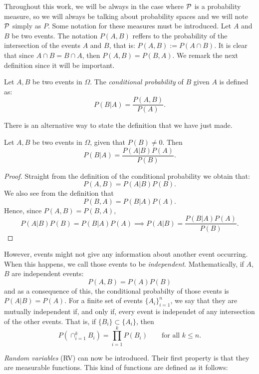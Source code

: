 Throughout this work, we will be always in the case where $\mathcal{P}$ is a probability measure, so we will always be talking about probability spaces and we will note $\mathcal{P}$ simply as $P$. Some notation for these measures must be introduced. Let $A$ and $B$ be two events.
The notation $P(A,B)$ reffers to the probability of the intersection of the events $A$ and $B$, that is: $P(A,B) := P(A\cap B)$.
 It is clear that since $A \cap B = B \cap A$, then $P(A,B) = P(B,A)$. We remark the next definition since it will be important.

\begin{ndef}
Let $A,B$ be two events in $\Omega$. The \emph{conditional probability} of $B$ given $A$ is defined as:
$$
P(B|A) = \frac{P(A,B)}{P(A)}.
$$
\end{ndef}




There is an alternative way to state the definition that we have just made.

\begin{nth}
Let $A,B$ be two events in $\Omega$, given that $P(B) \neq 0$. Then
$$
P(B|A) = \frac{P(A|B) P(A)}{P(B)}.
$$
\end{nth}
\begin{proof}
Straight from the definition of the conditional probability we obtain that:
$$
P(A,B) = P(A|B)P(B).
$$
We also see from the definition that
$$
P(B,A) = P(B|A)P(A).
$$
Hence, since $P(A,B) = P(B,A)$,
$$
P(A|B)P(B) = P(B|A)P(A) \implies P(A|B) = \frac{P(B|A)P(A)}{P(B)}.
$$
\end{proof}


However, events might not give any information about another event occurring. When this happens, we call those events to be \emph{independent}. Mathematically, if $A$,$B$ are independent events:
$$
P(A,B) = P(A)P(B)
$$
and as a consequence of this, the conditional probabilty of those events is $P(A|B) = P(A)$. For a finite set of events $\{A_i\}_{i=1}^n$, we say that they are mutually independent if, and only if, every event is independet of any intersection of the other events. 
That is, if $\{B_i\} \subset \{A_i\}$, then
$$
P\left(\cap_{i = 1}^k B_i \right) = \prod_{i = 1}^k P(B_i) \quad \quad \text{for all } k \leq n.
$$

\emph{Random variables} (RV) can now be introduced. Their first property is that they are measurable functions. This kind of functions are defined as it follows:

